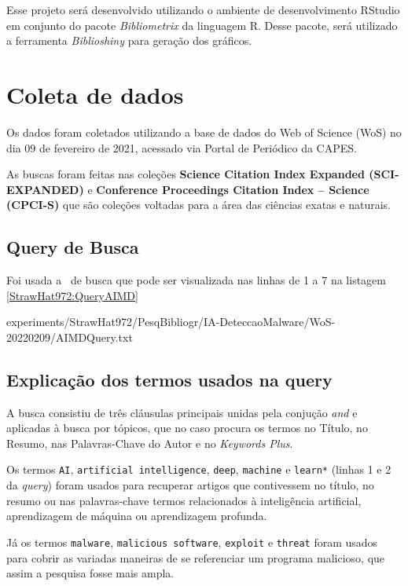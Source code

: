 Esse projeto será desenvolvido utilizando o ambiente de desenvolvimento RStudio em conjunto do pacote \textit{Bibliometrix} da linguagem R. Desse pacote, será utilizado a ferramenta \textit{Biblioshiny} para geração dos gráficos.

\section{Coleta de dados}

Os dados foram coletados utilizando a base de dados do Web of Science (WoS) no dia 09 de fevereiro de 2021, acessado via Portal de Periódico da CAPES.

As buscas foram feitas nas coleções \textbf{Science Citation Index Expanded (SCI-EXPANDED)} e \textbf{Conference Proceedings Citation Index – Science (CPCI-S)} que são coleções voltadas para a área das ciências exatas e naturais.

\subsection{Query de Busca}

Foi usada a \query\ de busca que pode ser visualizada nas linhas de 1 a 7 na listagem \ref{StrawHat972:QueryAIMD}


{experiments/StrawHat972/PesqBibliogr/IA-DeteccaoMalware/WoS-20220209/AIMDQuery.txt}

\subsection{Explicação dos termos usados na query}

A busca consistiu de três cláusulas principais unidas pela conjução \textit{and} e aplicadas à busca por tópicos, que no caso procura os termos no Título, no Resumo, nas Palavras-Chave do Autor e no \textit{Keywords Plus}.

Os termos \texttt{AI}, \texttt{artificial intelligence}, \texttt{deep}, \texttt{machine} e \texttt{learn*} (linhas 1 e 2 da \textit{query}) foram usados para recuperar artigos que contivessem no título, no resumo ou nas palavras-chave termos relacionados à inteligência artificial, aprendizagem de máquina ou aprendizagem profunda.

Já os termos \texttt{malware}, \texttt{malicious software}, \texttt{exploit} e \texttt{threat} foram usados para cobrir as variadas maneiras de se referenciar um programa malicioso, que assim a pesquisa fosse mais ampla.

